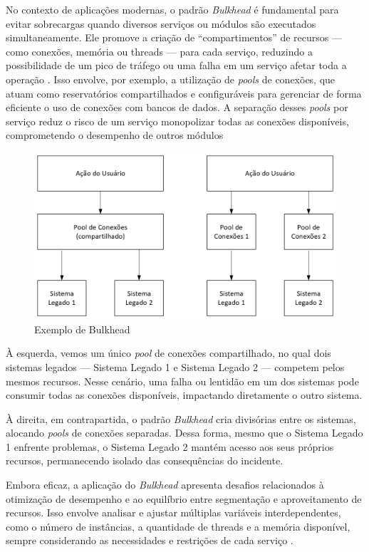 No contexto de aplicações modernas, o padrão \textit{Bulkhead} é fundamental para evitar sobrecargas quando diversos serviços ou módulos são executados simultaneamente. Ele promove a criação de “compartimentos” de recursos — como conexões, memória ou threads — para cada serviço, reduzindo a possibilidade de um pico de tráfego ou uma falha em um serviço afetar toda a operação \citep{kostenko2023antifragile}. Isso envolve, por exemplo, a utilização de \textit{pools} de conexões, que atuam como reservatórios compartilhados e configuráveis para gerenciar de forma eficiente o uso de conexões com bancos de dados. A separação desses \textit{pools} por serviço reduz o risco de um serviço monopolizar todas as conexões disponíveis, comprometendo o desempenho de outros módulos \citep{Sobri2022} 

\begin{figure}[H]
\centering
\includegraphics[width=0.8\linewidth]{imagens/bulkhead-pattern-diagram.png}
\caption{Exemplo de Bulkhead \citep{alashqar2022microservices}}
\label{fig:bulkhead-pattern-diagram}
\end{figure}

À esquerda, vemos um único \textit{pool} de conexões compartilhado, no qual dois sistemas legados — Sistema Legado 1 e Sistema Legado 2 — competem pelos mesmos recursos. Nesse cenário, uma falha ou lentidão em um dos sistemas pode consumir todas as conexões disponíveis, impactando diretamente o outro sistema.

À direita, em contrapartida, o padrão \textit{Bulkhead} cria divisórias entre os sistemas, alocando \textit{pools} de conexões separadas. Dessa forma, mesmo que o Sistema Legado 1 enfrente problemas, o Sistema Legado 2 mantém acesso aos seus próprios recursos, permanecendo isolado das consequências do incidente.

Embora eficaz, a aplicação do \textit{Bulkhead} apresenta desafios relacionados à otimização de desempenho e ao equilíbrio entre segmentação e aproveitamento de recursos. Isso envolve analisar e ajustar múltiplas variáveis interdependentes, como o número de instâncias, a quantidade de threads e a memória disponível, sempre considerando as necessidades e restrições de cada serviço \citep{nygard2018release}.

